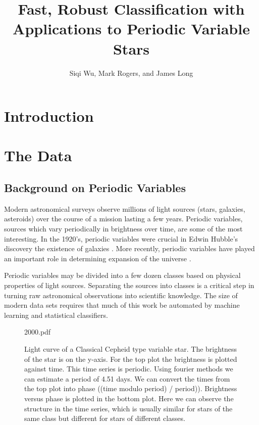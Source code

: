 \documentclass[11pt]{article}
\begin{document}
\title{Fast, Robust Classification with Applications to Periodic Variable Stars}
\author{Siqi Wu, Mark Rogers, and James Long}
\maketitle


\section{Introduction}

\section{The Data}
\subsection{Background on Periodic Variables}
Modern astronomical surveys observe millions of light sources (stars, galaxies, asteroids) over the course of a mission lasting a few years. Periodic variables, sources which vary periodically in brightness over time, are some of the most interesting. In the 1920's, periodic variables were crucial in Edwin Hubble's discovery the existence of galaxies \cite{berendzen1971hubble}. More recently, periodic variables have played an important role in determining expansion of the universe \cite{freedman2010hubble}.

Periodic variables may be divided into a few dozen classes based on physical properties of light sources. Separating the sources into classes is a critical step in turning raw astronomical observations into scientific knowledge. The size of modern data sets requires that much of this work be automated by machine learning and statistical classifiers. 
\begin{figure}[h]
  \begin{center}
    \begin{includegraphics}[scale=.5]{2000.pdf}
      \caption{Light curve of a Classical Cepheid type variable star. The brightness of the star is on the y-axis. For the top plot the brightness is plotted against time. This time series is periodic. Using fourier methods we can estimate a period of 4.51 days. We can convert the times from the top plot into phase ((time modulo period) / period)). Brightness versus phase is plotted in the bottom plot. Here we can observe the structure in the time series, which is usually similar for stars of the same class but different for stars of different classes.\label{fig:cepheid}}
    \end{includegraphics}
  \end{center}
\end{figure}
\end{document}
